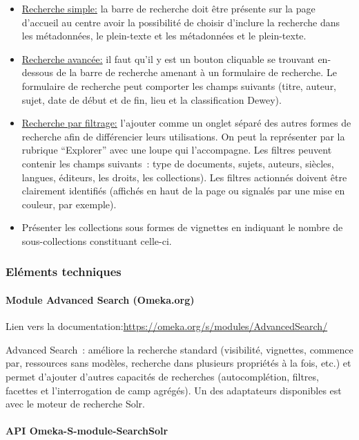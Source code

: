 \begin{itemize}
	\item \uline{Recherche simple:} la barre de recherche doit être présente sur la page d’accueil au centre avoir la possibilité de choisir d’inclure la recherche dans les métadonnées, le plein-texte et les métadonnées et le plein-texte. 
\item \uline{Recherche avancée:} il faut qu’il y est un bouton cliquable se trouvant en-dessous de la barre de recherche amenant à un formulaire de recherche. Le formulaire de recherche peut comporter les champs suivants (titre, auteur, sujet, date de début et de fin, lieu et la classification Dewey).
\item \uline{Recherche par filtrage:} l’ajouter comme un onglet séparé des autres formes de recherche afin de différencier leurs utilisations. On peut la représenter par la rubrique \enquote{Explorer} avec une loupe qui l’accompagne. Les filtres peuvent contenir les champs suivants : type de documents, sujets, auteurs, siècles, langues, éditeurs, les droits, les collections). Les filtres actionnés doivent être clairement identifiés (affichés en haut de la page ou signalés par une mise en couleur, par exemple).
\item Présenter les collections sous formes de vignettes en indiquant le nombre de sous-collections constituant celle-ci. 
\end{itemize}

\subsubsection{Eléments techniques}

\paragraph*{Module Advanced Search (Omeka.org)}

Lien vers la documentation:\url{https://omeka.org/s/modules/AdvancedSearch/}

Advanced Search : améliore la recherche standard (visibilité, vignettes, commence par, ressources sans modèles, recherche dans plusieurs propriétés à la fois, etc.) et permet d’ajouter d’autres capacités de recherches (autocomplétion, filtres, facettes et l’interrogation de camp agrégés). Un des adaptateurs disponibles est avec le moteur de recherche Solr.

\paragraph*{API Omeka-S-module-SearchSolr}

